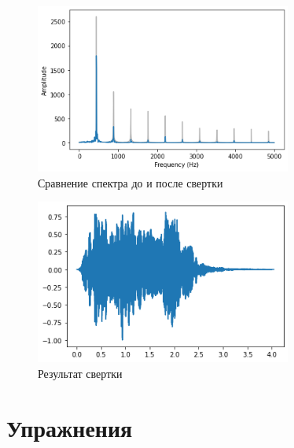 \documentclass[a4paper, 12pt]{report}
\begin{document}
	\begin{figure}[H]
		\centering
		\includegraphics[width=0.75\textwidth]{shot13.png}
		\caption{Сравнение спектра до и после свертки}
		\label{fig:shot13}
	\end{figure}
	\begin{figure}[H]
		\centering
		\includegraphics[width=0.75\textwidth]{shot14.png}
		\caption{Результат свертки}
		\label{fig:shot14}
	\end{figure}
	
	\chapter{Упражнения}
\end{document}

